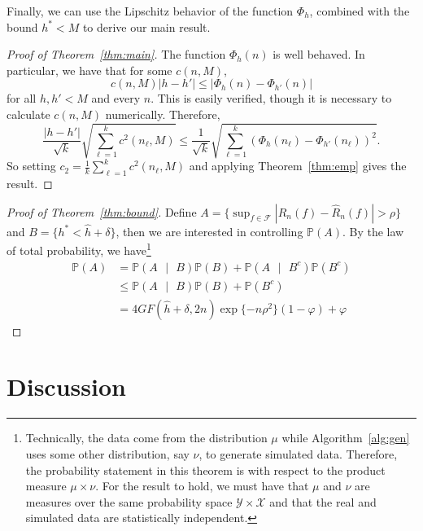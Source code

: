 \documentclass[11pt]{article}
\newcommand{\given}{\mbox{ }\vert\mbox{ }}
\newcommand{\F}{\mathcal{F}}
\renewcommand{\P}{\mathbb{P}}
\renewcommand{\hat}[1]{\widehat{#1}}
\begin{document}
Finally, we can use the Lipschitz behavior of the function $\Phi_h$, combined
with the bound $h^*<M$ to derive our main result.
\begin{proof}[Proof of Theorem~\ref{thm:main}]
  The function $\Phi_h(n)$ is well behaved. In particular, we have that for some $c(n,M)$,
  \begin{equation*}
    \label{eq:2b}
    c(n,M)|h-h'| \leq |\Phi_h(n) - \Phi_{h'}(n)|
  \end{equation*}
  for all $h,h'<M$ and every $n$.  This is easily verified, though it is
  necessary to calculate $c(n,M)$ numerically. Therefore,
  \begin{equation*}
    \label{eq:3b}
    \frac{|h-h'|}{\sqrt{k}}\sqrt{\sum_{\ell=1}^k
          c^2(n_\ell,M)} \leq \frac{1}{\sqrt{k}}
      \sqrt{\sum_{\ell=1}^k
        \left(\Phi_h(n_\ell)-\Phi_{h'}(n_\ell)\right)^2}.
    \end{equation*}
 So setting $c_2=\frac{1}{k}\sum_{\ell=1}^k c^2(n_\ell,M)$ and applying
 Theorem~\ref{thm:emp} gives the result.
\end{proof}

\begin{proof}[Proof of Theorem~\ref{thm:bound}]
  Define $A=\{\sup_{f\in\F}|R_n(f) - \widehat{R}_n(f)|>\rho\}$ and $B=\{h^* <
  \widehat{h}+\delta\}$, then we are interested in controlling $\P(A)$. By the
  law of total probability, we have\footnote{Technically, the data
    come from the distribution $\mu$ while Algorithm~\ref{alg:gen}
    uses some other distribution, say $\nu$, to generate simulated data. Therefore,
    the probability statement in this theorem is with respect to the
    product measure $\mu\times\nu$. For the result to hold, we must
    have that $\mu$ and $\nu$ are measures over the same probability space
    $\mathcal{Y}\times\mathcal{X}$ and that the real and simulated
    data are statistically independent.}
  \begin{align*}
    \P(A) &= \P(A\given B)\P(B) + \P(A\given B^c)\P(B^c)\\
    &\leq \P(A\given B)\P(B) + \P(B^c)\\
    &=4GF(\hat{h}+\delta,2n) \exp\{-n\rho^2\}(1-\varphi) + \varphi
 \end{align*}
\end{proof}




\section{Discussion}
\label{sec:discussion}
\end{document}
